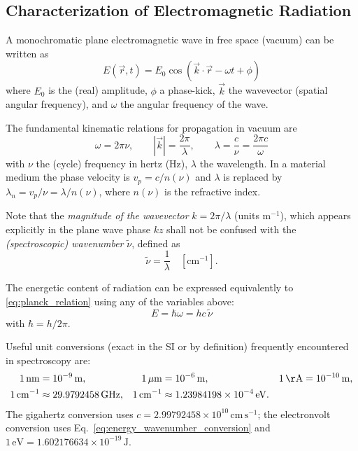 \subsection{Characterization of Electromagnetic Radiation}
\label{subsec:em_radiation_characterization}

\noindent A monochromatic plane electromagnetic wave in free space (vacuum) can be written as
\begin{equation}
	E(\vec{r},t) = E_0 \cos(\vec{k} \cdot \vec{r} - \omega t + \phi)
	\label{eq:plane_wave}
\end{equation}
where $E_0$ is the (real) amplitude, $\phi$ a phase-kick, $\vec{k}$ the wavevector (spatial angular frequency), and $\omega$ the angular frequency of the wave.

The fundamental kinematic relations for propagation in vacuum are
\begin{equation}
	\omega = 2\pi\nu, \qquad |\vec{k}| = \frac{2\pi}{\lambda}, \qquad \lambda = \frac{c}{\nu} = \frac{2\pi c}{\omega}
	\label{eq:wavelength_frequency_relation}
\end{equation}
with $\nu$ the (cycle) frequency in hertz (Hz), $\lambda$ the wavelength. In a material medium the phase velocity is $v_p = c/n(\nu)$ and $\lambda$ is replaced by $\lambda_n = v_p/\nu = \lambda/n(\nu)$, where $n(\nu)$ is the refractive index.

\noindent Note that the \emph{magnitude of the wavevector } $k = 2\pi/\lambda$ (units m$^{-1}$), which appears explicitly in the plane wave phase $kz$ shall not be confused with the \emph{(spectroscopic) wavenumber} $\tilde{\nu}$, defined as
\begin{equation}
	\tilde{\nu} = \frac{1}{\lambda} \quad [\mathrm{cm}^{-1}].
	\label{eq:wavenumber_definition}
\end{equation}

The energetic content of radiation can be expressed equivalently to \eqref{eq:planck_relation} using any of the variables above:
\begin{equation}
	E = \hbar\omega = h c \, \tilde{\nu}
	\label{eq:energy_wavenumber_conversion}
\end{equation}
with $\hbar = h/2\pi$.

\noindent Useful unit conversions (exact in the SI or by definition) frequently encountered in spectroscopy are:
\begin{align}
	1\,\mathrm{nm}      & = 10^{-9}\,\mathrm{m},                        &
	1\,\mu\mathrm{m}    & = 10^{-6}\,\mathrm{m},                        &
	1\,\mathrm{\AA}     & = 10^{-10}\,\mathrm{m},                         \\
	1\,\mathrm{cm}^{-1} & \approx 29.9792458\,\mathrm{GHz},             &
	1\,\mathrm{cm}^{-1} & \approx 1.23984198\times10^{-4}\,\mathrm{eV}.
	\label{eq:unit_conversions}
\end{align}
The gigahertz conversion uses $c = 2.99792458\times10^{10}\,\mathrm{cm\,s^{-1}}$; the electronvolt conversion uses Eq.~\eqref{eq:energy_wavenumber_conversion} and $1\,\mathrm{eV} = 1.602176634\times10^{-19}\,\mathrm{J}$.


